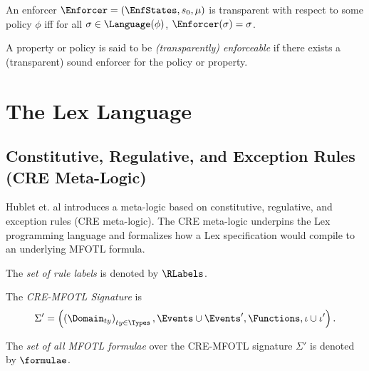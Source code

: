 \begin{definition}
    \label{def:enf-transparent-policy}
    An enforcer $\Enforcer = \left( \EnfStates, s_0, \mu \right)$ is transparent
    with respect to some policy $\phi$ iff for all $\sigma \in \Language(\phi)$,
    $\Enforcer(\sigma) = \sigma$.
\end{definition}

A property or policy is said to be \emph{(transparently) enforceable} if there
exists a (transparent) sound enforcer for the policy or property.




\section{The Lex Language}
\label{section:lex-language}

\subsection{Constitutive, Regulative, and Exception Rules (CRE Meta-Logic)}
\label{subsection:cre-meta-logic}
Hublet et. al \cite{lex} introduces a meta-logic based on
constitutive, regulative, and exception rules (CRE meta-logic).
The CRE meta-logic underpins the Lex programming language
and formalizes how a Lex specification would compile
to an underlying MFOTL formula.

\begin{definition}
    \label{def:cre-rule-labels}
    The \emph{set of rule labels} is denoted by $\RLabels$.
\end{definition}

\begin{definition}
    \label{def:cre-mfotl-signature}
    The \emph{CRE-MFOTL Signature} is 
    $$
    \Sigma' = \left(
    \left(\Domain_{ty} \right)_{ty \in\Types}, 
    \Events \cup \Events',
    \Functions,
    \iota \cup \iota'
    \right).
    $$
\end{definition}

\begin{definition}
    \label{def:set-of-mfotl-formulae}
    The \emph{set of all MFOTL formulae} over the CRE-MFOTL signature
    $\Sigma'$ is denoted by $\formulae$.
\end{definition}

